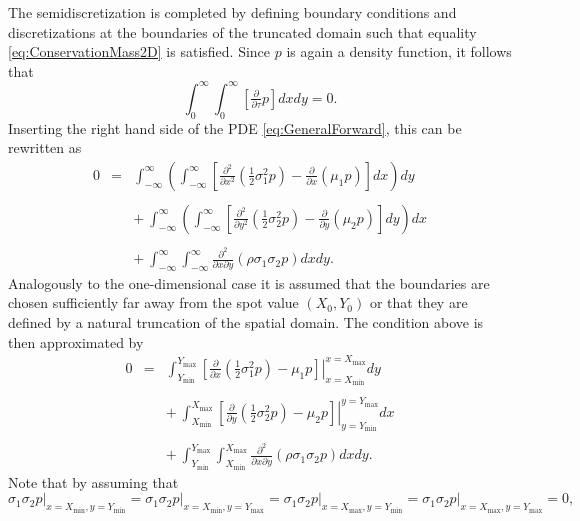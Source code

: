 \documentclass[10pt]{article}
\begin{document}
The semidiscretization is completed by defining boundary conditions and discretizations at the boundaries of the truncated domain such that equality \eqref{eq:ConservationMass2D} is satisfied.
Since $p$ is again a density function, it follows that
$$ \int_{0}^{\infty}\int_{0}^{\infty} \left[ \tfrac{\partial}{\partial \tau} p \right] dx dy = 0. $$
Inserting the right hand side of the PDE \eqref{eq:GeneralForward}, this can be rewritten as
\begin{eqnarray*}
0 &=& \int_{-\infty}^{\infty} \left( \int_{-\infty}^{\infty} \left[ \tfrac{\partial^{2}}{\partial x^{2}} \left(\tfrac{1}{2} \sigma^{2}_{1}p \right) -  \tfrac{\partial}{\partial x} \left( \mu_{1} p \right) \right] dx \right) dy \\\\
&& + \ \int_{-\infty}^{\infty} \left( \int_{-\infty}^{\infty} \left[ \tfrac{\partial^{2}}{\partial y^{2}} \left( \tfrac{1}{2} \sigma_{2}^{2} p \right) - \tfrac{\partial}{\partial y} \left( \mu_{2} p \right) \right] dy \right) dx \\\\
&& + \ \int_{-\infty}^{\infty}\int_{-\infty}^{\infty} \tfrac{\partial^{2}}{\partial x \partial y} \left( \rho \sigma_{1}\sigma_{2} p \right) dx dy.
\end{eqnarray*}
Analogously to the one-dimensional case it is assumed that the boundaries are chosen sufficiently far away from the spot value $(X_{0},Y_{0})$ or that they are defined by a natural truncation of the spatial domain. 
The condition above is then approximated by
\begin{eqnarray}
0 &=& \int_{Y_{\min}}^{Y_{\max}} \left. \left[ \tfrac{\partial}{\partial x} \left(\tfrac{1}{2} \sigma^{2}_{1}p \right) - \mu_{1} p \right]\right\vert_{x=X_{\min}}^{x=X_{\max}} dy \nonumber \\ \nonumber \\
&& + \ \int_{X_{\min}}^{X_{\max}} \left. \left[ \tfrac{\partial}{\partial y} \left(\tfrac{1}{2} \sigma^{2}_{2}p \right) - \mu_{2} p \right] \right\vert_{y=Y_{\min}}^{y=Y_{\max}} dx \nonumber \\ \nonumber \\
&& + \ \int_{Y_{\min}}^{Y_{\max}}\int_{X_{\min}}^{X_{\max}} \tfrac{\partial^{2}}{\partial x \partial y} \left( \rho \sigma_{1}\sigma_{2} p \right) dx dy. \label{eq:BC2D}
\end{eqnarray}
Note that by assuming that
\begin{equation}
\sigma_{1}\sigma_{2}p \vert_{x=X_{\min},y=Y_{\min}} = \sigma_{1}\sigma_{2}p \vert_{x=X_{\min},y=Y_{\max}} = \sigma_{1}\sigma_{2}p \vert_{x=X_{\max},y=Y_{\min}} = \sigma_{1}\sigma_{2}p \vert_{x=X_{\max},y=Y_{\max}} =0,
\label{eq:HoekpuntenNul}
\end{equation}
\end{document}
